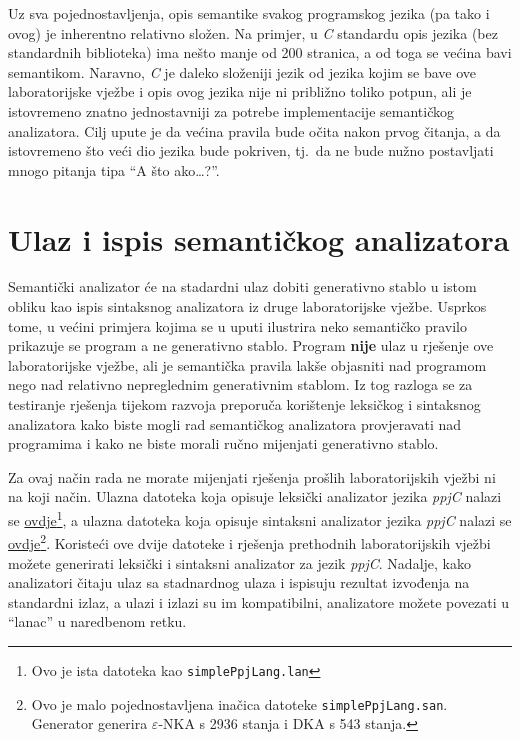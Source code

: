 \documentclass[times, 12pt, utf8]{book}
\begin{document}
Uz sva pojednostavljenja, opis semantike svakog programskog jezika (pa tako i ovog) je inherentno relativno složen.
Na primjer, u \emph{C} standardu opis jezika (bez standardnih biblioteka) ima nešto manje od 200 stranica, a od toga se većina bavi semantikom.
Naravno, \emph{C} je daleko složeniji jezik od jezika kojim se bave ove laboratorijske vježbe i opis ovog jezika nije ni približno toliko potpun, ali je istovremeno znatno jednostavniji za potrebe implementacije semantičkog analizatora.
Cilj upute je da većina pravila bude očita nakon prvog čitanja, a da istovremeno što veći dio jezika bude pokriven, tj.~da ne bude nužno postavljati mnogo pitanja tipa ``A što ako\ldots?''.

\section{Ulaz i ispis semantičkog analizatora}
Semantički analizator će na stadardni ulaz dobiti generativno stablo u istom obliku kao ispis sintaksnog analizatora iz druge laboratorijske vježbe.
Usprkos tome, u većini primjera kojima se u uputi ilustrira neko semantičko pravilo prikazuje se program a ne generativno stablo.
Program \textbf{nije} ulaz u rješenje ove laboratorijske vježbe, ali je semantička pravila lakše objasniti nad programom nego nad relativno nepreglednim generativnim stablom.
Iz tog razloga se za testiranje rješenja tijekom razvoja preporuča korištenje leksičkog i sintaksnog analizatora kako biste mogli rad semantičkog analizatora provjeravati nad programima i kako ne biste morali ručno mijenjati generativno stablo.

Za ovaj način rada ne morate mijenjati rješenja prošlih laboratorijskih vježbi ni na koji način.
Ulazna datoteka koja opisuje leksički analizator jezika \emph{ppjC} nalazi se \href{https://github.com/fer-ppj/ppj-labosi/raw/master/res/lab3/ppjC.lan}{ovdje}\footnote{Ovo je ista datoteka kao \texttt{simplePpjLang.lan}}, a ulazna datoteka koja opisuje sintaksni analizator jezika \emph{ppjC} nalazi se \href{https://github.com/fer-ppj/ppj-labosi/raw/master/res/lab3/ppjC.san}{ovdje}\footnote{Ovo je malo pojednostavljena inačica datoteke \texttt{simplePpjLang.san}. Generator generira \(\varepsilon\)-NKA s 2936 stanja i DKA s 543 stanja.}.
Koristeći ove dvije datoteke i rješenja prethodnih laboratorijskih vježbi možete generirati leksički i sintaksni analizator za jezik \emph{ppjC}.
Nadalje, kako analizatori čitaju ulaz sa stadnardnog ulaza i ispisuju rezultat izvođenja na standardni izlaz, a ulazi i izlazi su im kompatibilni, analizatore možete povezati u ``lanac'' u naredbenom retku.
\end{document}
